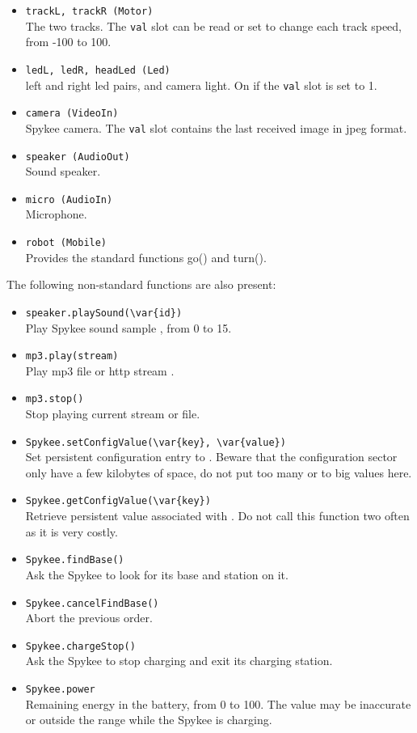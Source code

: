 \begin{itemize}
\item \lstinline|trackL, trackR (Motor)| \\
  The two tracks. The \lstinline|val| slot can be read or set to change each
  track speed, from -100 to 100.
\item \lstinline|ledL, ledR, headLed (Led)| \\
  left and right led pairs, and camera light. On if the \lstinline|val| slot
  is set to 1.
\item \lstinline|camera (VideoIn)| \\
  Spykee camera. The \lstinline|val| slot contains the last received image
  in jpeg format.
\item \lstinline|speaker (AudioOut)| \\
  Sound speaker.
\item \lstinline|micro (AudioIn)| \\
  Microphone.
\item \lstinline|robot (Mobile)| \\
  Provides the standard functions go() and turn().
\end{itemize}

The following non-standard functions are also present:

\begin{itemize}
\item \lstinline|speaker.playSound(\var{id})| \\
  Play Spykee sound sample , from 0 to 15.
\item \lstinline|mp3.play(stream)| \\
  Play mp3 file or http stream .
\item \lstinline|mp3.stop()| \\
  Stop playing current stream or file.
\item \lstinline|Spykee.setConfigValue(\var{key}, \var{value})| \\
  Set persistent configuration entry  to . Beware that
  the configuration sector only have a few kilobytes of space, do not put
  too many or to big values here.
\item \lstinline|Spykee.getConfigValue(\var{key})| \\
  Retrieve persistent value associated with . Do not call this
  function two often as it is very costly.
\item \lstinline|Spykee.findBase()| \\
  Ask the Spykee to look for its base and station on it.
\item \lstinline|Spykee.cancelFindBase()| \\
  Abort the previous order.
\item \lstinline|Spykee.chargeStop()| \\
  Ask the Spykee to stop charging and exit its charging station.
\item \lstinline|Spykee.power| \\
  Remaining energy in the battery, from 0 to 100. The value may be
  inaccurate or outside the range while the Spykee is charging.
\end{itemize}

